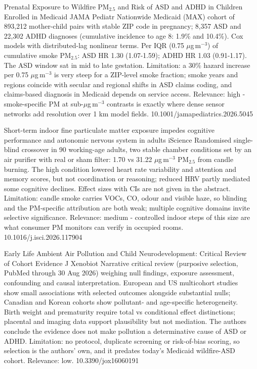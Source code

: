 \documentclass[10pt]{article}
\begin{document}

{Prenatal Exposure to Wildfire PM$_{2.5}$ and Risk of ASD and ADHD in Children Enrolled in Medicaid}
{JAMA Pediatr}
{Nationwide Medicaid (MAX) cohort of 893,212 mother-child pairs with stable ZIP code in pregnancy; 8,357 ASD and 22,302 ADHD diagnoses (cumulative incidence to age 8: 1.9\% and 10.4\%). Cox models with distributed-lag nonlinear terms. Per IQR (0.75 $\mu$g\,m$^{-3}$) of cumulative smoke PM$_{2.5}$: ASD HR 1.30 (1.07-1.59); ADHD HR 1.03 (0.91-1.17). The ASD window sat in mid to late gestation. Limitation: a 30\% hazard increase per 0.75 $\mu$g\,m$^{-3}$ is very steep for a ZIP-level smoke fraction; smoke years and regions coincide with secular and regional shifts in ASD claims coding, and claims-based diagnosis in Medicaid depends on service access. Relevance: high - smoke-specific PM at sub-$\mu$g\,m$^{-3}$ contrasts is exactly where dense sensor networks add resolution over 1 km model fields.}
{10.1001/jamapediatrics.2026.5045}

{Short-term indoor fine particulate matter exposure impedes cognitive performance and autonomic nervous system in adults}
{iScience}
{Randomised single-blind crossover in 90 working-age adults, two stable chamber conditions set by an air purifier with real or sham filter: 1.70 vs 31.22 $\mu$g\,m$^{-3}$ PM$_{2.5}$ from candle burning. The high condition lowered heart rate variability and attention and memory scores, but not coordination or reasoning; reduced HRV partly mediated some cognitive declines. Effect sizes with CIs are not given in the abstract. Limitation: candle smoke carries VOCs, CO, odour and visible haze, so blinding and the PM-specific attribution are both weak; multiple cognitive domains invite selective significance. Relevance: medium - controlled indoor steps of this size are what consumer PM monitors can verify in occupied rooms.}
{10.1016/j.isci.2026.117904}

{Early Life Ambient Air Pollution and Child Neurodevelopment: Critical Review of Cohort Evidence}
{J Xenobiot}
{Narrative critical review (purposive selection, PubMed through 30 Aug 2026) weighing null findings, exposure assessment, confounding and causal interpretation. European and US multicohort studies show small associations with selected outcomes alongside substantial nulls; Canadian and Korean cohorts show pollutant- and age-specific heterogeneity. Birth weight and prematurity require total vs conditional effect distinctions; placental and imaging data support plausibility but not mediation. The authors conclude the evidence does not make pollution a determinative cause of ASD or ADHD. Limitation: no protocol, duplicate screening or risk-of-bias scoring, so selection is the authors' own, and it predates today's Medicaid wildfire-ASD cohort. Relevance: low.}
{10.3390/jox16060191}
\end{document}
